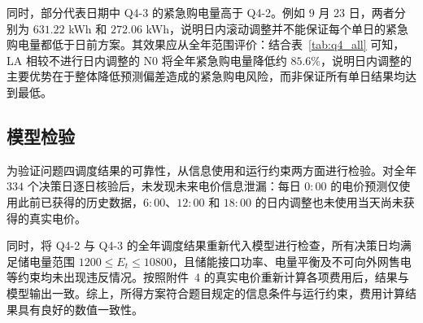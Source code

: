 同时，部分代表日期中 Q4-3 的紧急购电量高于 Q4-2。例如 $9$ 月 $23$ 日，两者分别为 $631.22$ kWh 和 $272.06$ kWh，说明日内滚动调整并不能保证每个单日的紧急购电量都低于日前方案。其效果应从全年范围评价：结合表~\ref{tab:q4_all} 可知，LA 相较不进行日内调整的 N0 将全年紧急购电量降低约 $85.6\%$，说明日内调整的主要优势在于整体降低预测偏差造成的紧急购电风险，而非保证所有单日结果均达到最低。

\subsection{模型检验}

为验证问题四调度结果的可靠性，从信息使用和运行约束两方面进行检验。对全年 $334$ 个决策日逐日核验后，未发现未来电价信息泄漏：每日 $0{:}00$ 的电价预测仅使用此前已获得的历史数据，$6{:}00$、$12{:}00$ 和 $18{:}00$ 的日内调整也未使用当天尚未获得的真实电价。

同时，将 Q4-2 与 Q4-3 的全年调度结果重新代入模型进行检查，所有决策日均满足储电量范围 $1200\le E_t\le10800$，且储能接口功率、电量平衡及不可向外网售电等约束均未出现违反情况。按照附件~4 的真实电价重新计算各项费用后，结果与模型输出一致。综上，所得方案符合题目规定的信息条件与运行约束，费用计算结果具有良好的数值一致性。
